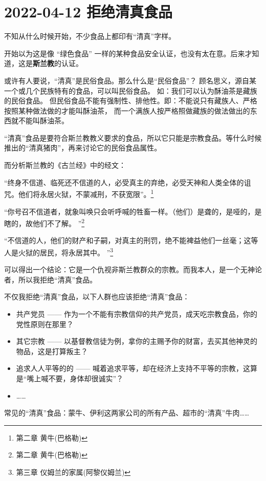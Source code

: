 \section{2022-04-12 拒绝清真食品}

不知从什么时候开始，不少食品上都印有“清真”字样。

开始以为这是像 “绿色食品” 一样的某种食品安全认证，也没有太在意。后来才知道，这是\textbf{斯兰教}的认证。

或许有人要说，“清真”是民俗食品。那么什么是“民俗食品”？
顾名思义，源自某一个或几个民族特有的食品，可以叫民俗食品。
如：我们可以认为酥油茶是藏族的民俗食品。
但民俗食品不能有强制性、排他性。即：不能说只有藏族人、严格按照某种做法做的才能叫酥油茶，
而一个满族人按严格照做藏族的做法做出的东西就不能叫酥油茶。

“清真”食品是要符合斯兰教教义要求的食品，所以它只能是宗教食品。等什么时候推出的“清真猪肉”，再来讨论它的民俗食品属性。

而分析斯兰教的《古兰经》中的经文：

“终身不信道、临死还不信道的人，必受真主的弃绝，必受天神和人类全体的诅咒。他们将永居火狱，不蒙减刑，不获宽限”。\footnote{第二章 黄牛(巴格勒)  }

“你号召不信道者，就象叫唤只会听呼喊的牲畜一样。（他们）是聋的，是哑的，是瞎的，故他们不了解。 ”\footnote{第二章 黄牛(巴格勒) }

“不信道的人，他们的财产和子嗣，对真主的刑罚，绝不能裨益他们一丝毫；这等人是火狱的居民，将永居其中。 ”\footnote{第三章 仪姆兰的家属(阿黎仪姆兰) }

可以得出一个结论：它是一个仇视非斯兰教群众的宗教。而我本人，是一个无神论者，所以我拒绝“清真”食品。

不仅我拒绝“清真”食品，以下人群也应该拒绝“清真”食品：

\begin{itemize}[nosep, left=\parindent]
    \item 共产党员 —— 作为一个不能有宗教信仰的共产党员，成天吃宗教食品，你的党性原则在那里？
    \item 其它宗教 —— 以基督教信徒为例，拿你的主赐予你的财富，去买其他神灵的物品，这是打算叛主？
    \item 追求人人平等的的 —— 喊着追求平等，却在经济上支持不平等的宗教，这算是“嘴上喊不要，身体却很诚实”？
    \item ……
\end{itemize}

常见的“清真”食品：蒙牛、伊利这两家公司的所有产品、超市的“清真”牛肉……

